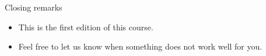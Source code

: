 \documentclass{beamer}
\begin{document}

\begin{frame}{Closing remarks}
    \begin{itemize}
        \item This is the first edition of this course.
        \item Feel free to let us know when something does not work well for you.
    \end{itemize}
    \end{frame}


\end{document}
